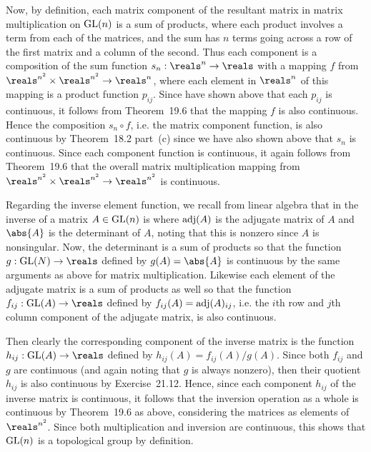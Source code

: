 {{    Now, by definition, each matrix component of the resultant matrix in matrix multiplication on $\mathrm{GL}(n)$ is a sum of products, where each product involves a term from each of the matrices, and the sum has $n$ terms going across a row of the first matrix and a column of the second.
    Thus each component is a composition of the sum function $s_n : \reals^n \to \reals$ with a mapping $f$ from $\reals^{n^2} \times \reals^{n^2} \to \reals^n$, where each element in $\reals^n$ of this mapping is a product function $p_{ij}$.
    Since have shown above that each $p_{ij}$ is continuous, it follows from Theorem~19.6 that the mapping $f$ is also continuous.
    Hence the composition $s_n \circ f$, i.e. the matrix component function, is also continuous by Theorem~18.2 part~(c) since we have also shown above that $s_n$ is continuous.
    Since each component function is continuous, it again follows from Theorem~19.6 that the overall matrix multiplication mapping from $\reals^{n^2} \times \reals^{n^2} \to \reals^{n^2}$ is continuous.

    Regarding the inverse element function, we recall from linear algebra that in the inverse of a matrix $A \in \mathrm{GL}(n)$ is
    where $\mathrm{adj}(A)$ is the adjugate matrix of $A$ and $\abs{A}$ is the determinant of $A$, noting that this is nonzero since $A$ is nonsingular.
    Now, the determinant is a sum of products so that the function $g: \gl(N) \to \reals$ defined by $g(A) = \abs{A}$ is continuous by the same arguments as above for matrix multiplication.
    Likewise each element of the adjugate matrix is a sum of products as well so that the function $f_{ij} : \gl(A) \to \reals$ defined by $f_{ij}(A) = \mathrm{adj}(A)_{ij}$, i.e. the $i$th row and $j$th column component of the adjugate matrix, is also continuous.

    Then clearly the corresponding component of the inverse matrix is the function $h_{ij} : \gl(A) \to \reals$ defined by $h_{ij}(A) = f_{ij}(A)/g(A)$.
    Since both $f_{ij}$ and $g$ are continuous (and again noting that $g$ is always nonzero), then their quotient $h_{ij}$ is also continuous by Exercise~21.12.
    Hence, since each component $h_{ij}$ of the inverse matrix is continuous, it follows that the inversion operation as a whole is continuous by Theorem~19.6 as above, considering the matrices as elements of $\reals^{n^2}$.
    Since both multiplication and inversion are continuous, this shows that $\mathrm{GL}(n)$ is a topological group by definition.
  }
}

